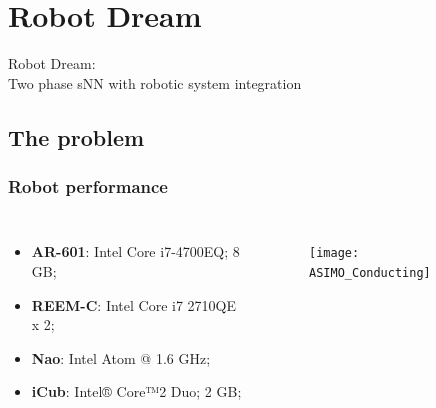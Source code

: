\documentclass[12pt, aspectratio=169]{beamer}
\begin{document}


\section{Robot Dream}
\begin{frame}
  Robot Dream:\\
  Two phase sNN with robotic system integration
\end{frame}

\subsection{The problem} %
\begin{frame}
\frametitle{Robot performance}
\begin{columns}[c] %

\begin{itemize}
\item \textbf{AR-601}: Intel Core i7-4700EQ; 8 GB;
\item \textbf{REEM-C}: Intel Core i7 2710QE x 2;
\item \textbf{Nao}: Intel Atom @ 1.6 GHz;
\item \textbf{iCub}: Intel® Core™2 Duo; 2 GB;
\end{itemize}


\begin{figure}
\texttt{[image: ASIMO\_Conducting]}
\end{figure}
\end{columns}
\end{frame}

\end{document}
